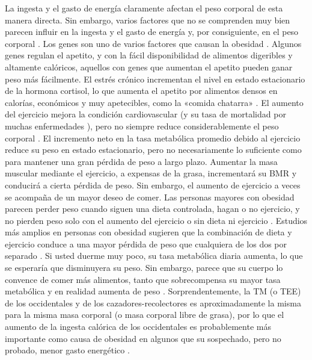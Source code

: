\documentclass[12pt]{book}
\begin{document}
La ingesta y el gasto de energía claramente afectan el peso corporal de esta manera directa. Sin embargo, varios factores que no se comprenden muy bien parecen influir en la ingesta y el gasto de energía y, por consiguiente, en el peso corporal \cite{56}. Los genes son uno de varios factores que causan la obesidad \cite{101}. Algunos genes regulan el apetito, y con la fácil disponibilidad de alimentos digeribles y altamente calóricos, aquellos con genes que aumentan el apetito pueden ganar peso más fácilmente. El estrés crónico incrementan el nivel en estado estacionario de la hormona cortisol, lo que aumenta el apetito por alimentos densos en calorías, económicos y muy apetecibles, como la «comida chatarra» \cite{1}. El aumento del ejercicio mejora la condición cardiovascular (y su tasa de mortalidad por muchas enfermedades \cite{12}), pero no siempre reduce considerablemente el peso corporal \cite{13,25,81}. El incremento neto en la tasa metabólica promedio debido al ejercicio reduce su peso en estado estacionario, pero no necesariamente lo suficiente como para mantener una gran pérdida de peso a largo plazo. Aumentar la masa muscular mediante el ejercicio, a expensas de la grasa, incrementará su BMR y conducirá a cierta pérdida de peso. Sin embargo, el aumento de ejercicio a veces se acompaña de un mayor deseo de comer. Las personas mayores con obesidad parecen perder peso cuando siguen una dieta controlada, hagan o no ejercicio, y no pierden peso solo con el aumento del ejercicio o sin dieta ni ejercicio \cite{102}. Estudios más amplios en personas con obesidad sugieren que la combinación de dieta y ejercicio conduce a una mayor pérdida de peso que cualquiera de los dos por separado \cite{48}. Si usted duerme muy poco, su tasa metabólica diaria aumenta, lo que se esperaría que disminuyera su peso. Sin embargo, parece que su cuerpo lo convence de comer más alimentos, tanto que sobrecompensa su mayor tasa metabólica y en realidad aumenta de peso \cite{8,61}. Sorprendentemente, la TM (o TEE) de los occidentales y de los cazadores-recolectores es aproximadamente la misma para la misma masa corporal (o masa corporal libre de grasa), por lo que el aumento de la ingesta calórica de los occidentales es probablemente más importante como causa de obesidad en algunos que su sospechado, pero no probado, menor gasto energético \cite{82}.
\end{document}
